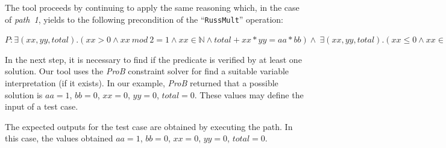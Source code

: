 \documentclass[runningheads]{llncs}
\begin{document}


The tool proceeds by continuing to apply the same reasoning which, in the case of \textit{path~1}, yields to the following precondition of the ``\texttt{RussMult}'' operation:


$P: \exists(xx, yy, total).(xx > 0 \wedge xx\ mod\ 2 = 1 \wedge xx \in \mathbb{N} \wedge total + xx * yy = aa * bb) \wedge \ \exists(xx, yy, total).(xx \leq 0 \wedge xx \in \mathbb{N} \wedge total + xx * yy = aa * bb) \wedge xx : \mathbb{N} \wedge yy : \mathbb{N} \wedge total : \mathbb{N} \wedge aa : \mathbb{N} \wedge bb : \mathbb{N}$ 

In the next step, it is necessary to find if the predicate is verified by at least one solution. 
Our tool uses the \textit{ProB} constraint solver for find a suitable variable interpretation (if it exists).
In our example, \textit{ProB} returned that a possible solution is $aa = 1$, $bb = 0$, $xx = 0$, $yy = 0$, $total = 0$. 
These values may define the input of a test case.

The expected outputs for the test case are obtained by executing the path. 
In this case, the values obtained $aa = 1$, $bb = 0$, $xx = 0$, $yy = 0$, $total = 0$.

\end{document}
